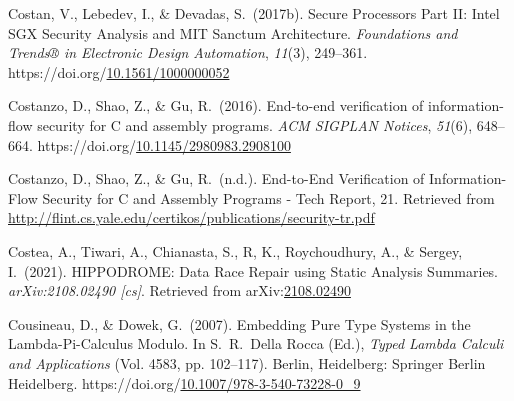 \documentclass[12pt,twoside]{article}
\begin{document}
{\begin{thebibliography}{1079}
\mdbibitemlabel{}Costan, V., Lebedev, I., \& Devadas, S.~(2017b). Secure Processors Part II: Intel SGX Security Analysis and MIT Sanctum Architecture. \emph{Foundations and Trends® in Electronic Design Automation}, \emph{11}(3), 249–361. https://doi.org/\href{https://dx.doi.org/10.1561/1000000052}{10.1561/1000000052}%

\mdbibitemlabel{}Costanzo, D., Shao, Z., \& Gu, R.~(2016). End-to-end verification of information-flow security for C and assembly programs. \emph{ACM SIGPLAN Notices}, \emph{51}(6), 648–664. https://doi.org/\href{https://dx.doi.org/10.1145/2980983.2908100}{10.1145/2980983.2908100}%

\mdbibitemlabel{}Costanzo, D., Shao, Z., \& Gu, R.~(n.d.). End-to-End Veriﬁcation of Information-Flow Security for C and Assembly Programs - Tech Report, 21. Retrieved from \href{http://flint.cs.yale.edu/certikos/publications/security-tr.pdf}{{\ttfamily http://\hspace{0pt}flint.\hspace{0pt}cs.\hspace{0pt}yale.\hspace{0pt}edu/\hspace{0pt}certikos/\hspace{0pt}publications/\hspace{0pt}security-\hspace{0pt}tr.\hspace{0pt}pdf}}%

\mdbibitemlabel{}Costea, A., Tiwari, A., Chianasta, S., R, K., Roychoudhury, A., \& Sergey, I.~(2021). HIPPODROME: Data Race Repair using Static Analysis Summaries. \emph{arXiv:2108.02490 {}[cs]}. Retrieved from arXiv:\href{http://arxiv.org/abs/2108.02490}{2108.02490}%

\mdbibitemlabel{}Cousineau, D., \& Dowek, G.~(2007). Embedding Pure Type Systems in the Lambda-Pi-Calculus Modulo. In S.~R.~Della Rocca (Ed.), \emph{Typed Lambda Calculi and Applications} (Vol. 4583, pp. 102–117). Berlin, Heidelberg: Springer Berlin Heidelberg. https://doi.org/\href{https://dx.doi.org/10.1007/978-3-540-73228-0_9}{10.1007/978-3-540-73228-0\_9}%


\end{thebibliography}}
\end{document}
